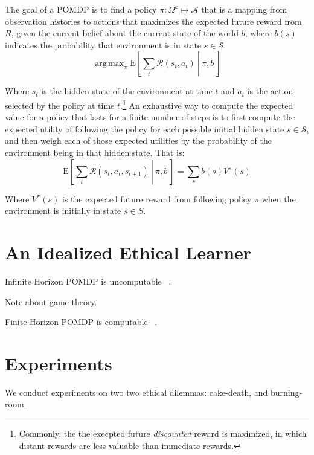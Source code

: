 \documentclass[11pt]{article}
\DeclareMathOperator*{\argmax}{arg\,max}
\begin{document}
The goal of a POMDP is to find a policy $\pi : \Omega^k \mapsto \mathcal{A}$ that is a mapping from observation histories to actions that maximizes the expected future reward from $R$, given the current belief about the current state of the world $b$, where $b(s)$ indicates the probability that environment is in state $s \in \mathcal{S}$. 
\begin{equation}
\argmax_\pi \left.\text{E}\left[\sum_t \mathcal{R}(s_t,a_t)\ \right|\ \pi, b\ \right]
\end{equation}

Where $s_t$ is the hidden state of the environment at time $t$ and $a_t$ is the action selected by the policy at time $t$.\footnote{Commonly, the the execpted future {\em discounted} reward is maximized, in which distant rewards are less valuable than immediate rewards.} An exhaustive way to compute the expected value for a policy that lasts for a finite number of steps is to first compute the expected utility of following the policy for each possible initial hidden state $s \in \mathcal{S}$, and then weigh each of those expected utilities by the probability of the environment being in that hidden state. That is:
\begin{equation}
\left.\text{E}\left[\sum_t \mathcal{R}(s_t,a_t,s_{t+1})\ \right|\ \pi, b\ \right] = \sum_s b(s) V^\pi(s)
\end{equation}

Where $V^\pi(s)$ is the expected future reward from following policy $\pi$ when the environment is initially in state $s \in S$.

\section{An Idealized Ethical Learner}

Infinite Horizon POMDP is uncomputable ~\cite{madani1999undecidability}.

Note about game theory.

Finite Horizon POMDP is computable ~\cite{mundhenk2000complexity}.




\section{Experiments}

We conduct experiments on two two ethical dilemmas: cake-death, and burning-room.
\end{document}
